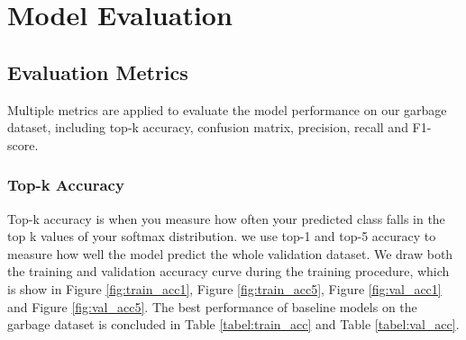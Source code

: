 \section{Model Evaluation}

\subsection{Evaluation Metrics}
Multiple metrics are applied to evaluate the model performance on our garbage dataset, including top-k accuracy, confusion matrix, precision, recall and F1-score.

\subsubsection{Top-k Accuracy}
Top-k accuracy is when you measure how often your predicted class falls in the top k values of your softmax distribution\cite{topk}. we use top-1 and top-5 accuracy to measure how well the model predict the whole validation dataset. We draw both the training and validation accuracy curve during the training procedure, which is show in Figure \ref{fig:train_acc1}, Figure \ref{fig:train_acc5}, Figure \ref{fig:val_acc1} and Figure \ref{fig:val_acc5}. The best performance of baseline models on the garbage dataset is concluded in Table \ref{tabel:train_acc} and Table \ref{tabel:val_acc}.

